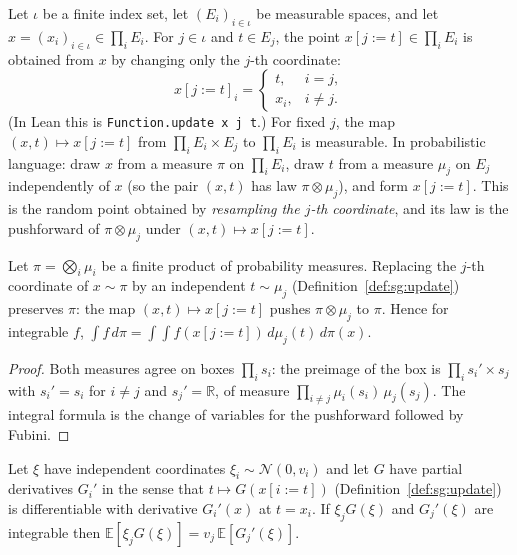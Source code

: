 \begin{definition}\label{def:sg:update}
Let $\iota$ be a finite index set, let $(E_i)_{i\in\iota}$ be measurable spaces, and let $x=(x_i)_{i\in\iota}\in\prod_iE_i$.
For $j\in\iota$ and $t\in E_j$, the point $x[j:=t]\in\prod_iE_i$ is obtained from $x$ by changing only the $j$-th coordinate:
\[x[j:=t]_i=\begin{cases}t,&i=j,\\ x_i,&i\ne j.\end{cases}\]
(In Lean this is \texttt{Function.update x j t}.) For fixed $j$, the map $(x,t)\mapsto x[j:=t]$ from
$\prod_iE_i\times E_j$ to $\prod_iE_i$ is measurable. In probabilistic language: draw $x$ from a measure $\pi$ on $\prod_iE_i$,
draw $t$ from a measure $\mu_j$ on $E_j$ independently of $x$ (so the pair $(x,t)$ has law $\pi\otimes\mu_j$), and
form $x[j:=t]$. This is the random point obtained by \emph{resampling the $j$-th coordinate}, and its law is the
pushforward of $\pi\otimes\mu_j$ under $(x,t)\mapsto x[j:=t]$.
\end{definition}

\begin{lemma}\label{lem:sg:resample}
  \leanok
Let $\pi=\bigotimes_{i}\mu_i$ be a finite product of probability measures. Replacing the $j$-th coordinate of
$x\sim\pi$ by an independent $t\sim\mu_j$ (Definition~\ref{def:sg:update}) preserves $\pi$: the map $(x,t)\mapsto x[j:=t]$ pushes $\pi\otimes\mu_j$ to $\pi$.
Hence for integrable $f$, $\int f\,d\pi=\int\!\!\int f(x[j:=t])\,d\mu_j(t)\,d\pi(x)$.
\end{lemma}

\begin{proof}
  \leanok
Both measures agree on boxes $\prod_i s_i$: the preimage of the box is $\prod_i s_i'\times s_j$ with $s_i'=s_i$ for $i\ne j$
and $s_j'=\mathbb R$, of measure $\prod_{i\ne j}\mu_i(s_i)\,\mu_j(s_j)$. The integral formula is the change of variables for the
pushforward followed by Fubini.
\end{proof}

\begin{theorem}\label{thm:sg:steinpi}
  \leanok
Let $\xi$ have independent coordinates $\xi_i\sim\mathcal N(0,v_i)$ and let $G$ have partial derivatives $G_i'$ in the sense that
$t\mapsto G(x[i:=t])$ (Definition~\ref{def:sg:update}) is differentiable with derivative $G_i'(x)$ at $t=x_i$. If $\xi_jG(\xi)$ and $G_j'(\xi)$ are integrable then
$\mathbb E[\xi_jG(\xi)]=v_j\,\mathbb E[G_j'(\xi)]$.
\end{theorem}

